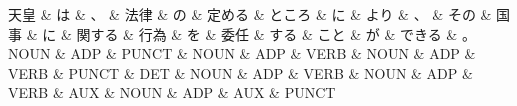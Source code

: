 \documentclass[tikz,border=5pt]{standalone}
\begin{document}
\normalsize
\begin{dependency}[edge unit distance=12.0pt]
    \begin{deptext}[column sep=1em]
        天皇 \& は \& 、 \& 法律 \& の \& 定める \& ところ \& に \& より \& 、 \& その \& 国事 \& に \& 関する \& 行為 \& を \& 委任 \& する \& こと \& が \& できる \& 。\\
        NOUN \& ADP \& PUNCT \& NOUN \& ADP \& VERB \& NOUN \& ADP \& VERB \& PUNCT \& DET \& NOUN \& ADP \& VERB \& NOUN \& ADP \& VERB \& AUX \& NOUN \& ADP \& AUX \& PUNCT\\
    \end{deptext}
\end{dependency}
\end{document}
